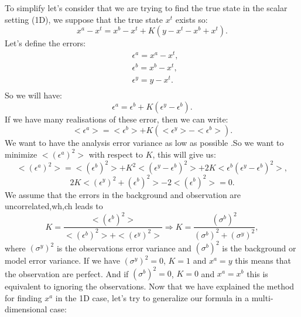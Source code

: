 \noindent To simplify let's consider that we are trying to find the true state in the scalar setting (1D), we suppose that the true state $x^t$ exists so:
$$x^a-x^t=x^b-x^t+K(y-x^t-x^b+x^t).$$
Let's define the errors:
$$\begin{aligned}
&\epsilon^a=x^a-x^t, \\
&\epsilon^b=x^b-x^t, \\
&\epsilon^y=y-x^t. \\
\end{aligned}$$
So we will have:
$$\epsilon^a=\epsilon^b+K(\epsilon^y-\epsilon^b).$$
If we have many realisations of these error, then we can write:
$$<\epsilon^a>=<\epsilon^b>+K(<\epsilon^y>-<\epsilon^b>).$$
We want to have the analysis error variance as low as possible .So we want to minimize $<(\epsilon^a)^2>$ with respect to $K$, this will give us:
$$<(\epsilon^a)^2>=<(\epsilon^b)^2>+K^2<(\epsilon^y-\epsilon^b)^2>+2K<\epsilon^b(\epsilon^y-\epsilon^b)^2>,$$
$$2K<(\epsilon^y)^2+(\epsilon^b)^2>-2<(\epsilon^b)^2>=0.$$
\noindent We assume that the errors in the background and observation are uncorrelated,wh,ch leads to
$$K=\frac{<(\epsilon^b)^2>}{<(\epsilon^b)^2>+<(\epsilon^y)^2>} \Rightarrow K=\frac{(\sigma^b)^2}{(\sigma^b)^2+(\sigma^y)^2}, $$
where $(\sigma^y)^2$ is the observations error variance and $(\sigma^b)^2$ is the background or model error variance.
\newline\noindent If we have $(\sigma^y)^2=0$, $K=1$ and $x^a=y$  this means that the observation are perfect.
\newline\noindent And if $(\sigma^b)^2=0$, $K=0$ and $x^a=x^b$ this is equivalent to ignoring the observations.
\vspace*{5mm}
\newline Now that we have explained the method for finding $x^a$ in the 1D case, let's try to generalize our formula in a multi-dimensional case:

